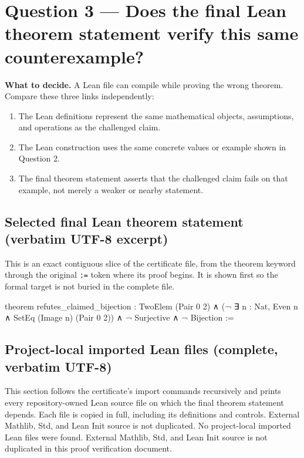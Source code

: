 \documentclass[11pt]{article}
\begin{document}
\section*{Question 3 --- Does the final Lean theorem statement verify this same counterexample?}
\textbf{What to decide.} A Lean file can compile while proving the wrong theorem. Compare these three links independently:
\begin{enumerate}
\item The Lean definitions represent the same mathematical objects, assumptions, and operations as the challenged claim.
\item The Lean construction uses the same concrete values or example shown in Question 2.
\item The final theorem statement asserts that the challenged claim fails on that example, not merely a weaker or nearby statement.
\end{enumerate}
\subsection*{Selected final Lean theorem statement (verbatim UTF-8 excerpt)}
This is an exact contiguous slice of the certificate file, from the theorem keyword through the original \texttt{:=} token where its proof begins. It is shown first so the formal target is not buried in the complete file.
\begin{Vlean}
theorem refutes_claimed_bijection :
    TwoElem (Pair 0 2) ∧
    (¬ ∃ n : Nat, Even n ∧ SetEq (Image n) (Pair 0 2)) ∧
    ¬ Surjective ∧
    ¬ Bijection :=
\end{Vlean}
\subsection*{Project-local imported Lean files (complete, verbatim UTF-8)}
This section follows the certificate's import commands recursively and prints every repository-owned Lean source file on which the final theorem statement depends. Each file is copied in full, including its definitions and controls. External Mathlib, Std, and Lean Init source is not duplicated.
No project-local imported Lean files were found. External Mathlib, Std, and Lean Init source is not duplicated in this proof verification document.
\end{document}
